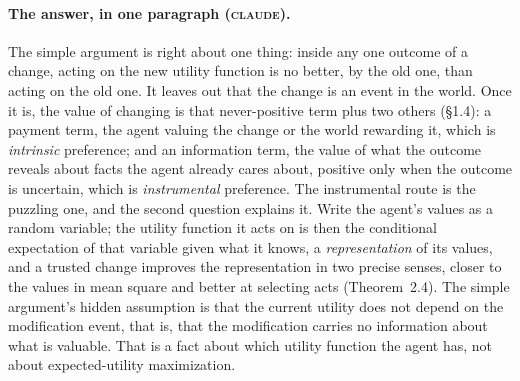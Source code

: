 \documentclass[11pt,a4paper]{article}
\newcommand{\CLAUDE}{\textnormal{\scshape claude}}
\begin{document}
\paragraph{The answer, in one paragraph (\CLAUDE).}
The simple argument is right about one thing: inside any one outcome of a change, acting on the new utility function is no better, by the old one, than acting on the old one. It leaves out that the change is an event in the world. Once it is, the value of changing is that never-positive term plus two others (\S1.4): a payment term, the agent valuing the change or the world rewarding it, which is \emph{intrinsic} preference; and an information term, the value of what the outcome reveals about facts the agent already cares about, positive only when the outcome is uncertain, which is \emph{instrumental} preference. The instrumental route is the puzzling one, and the second question explains it. Write the agent's values as a random variable; the utility function it acts on is then the conditional expectation of that variable given what it knows, a \emph{representation} of its values, and a trusted change improves the representation in two precise senses, closer to the values in mean square and better at selecting acts (Theorem~2.4). The simple argument's hidden assumption is that the current utility does not depend on the modification event, that is, that the modification carries no information about what is valuable. That is a fact about which utility function the agent has, not about expected-utility maximization.
\end{document}
